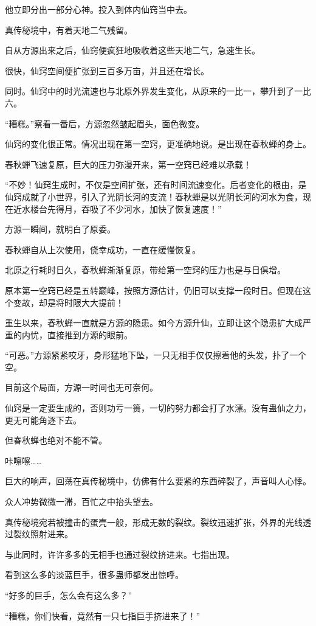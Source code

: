 \begin{this_body}
他立即分出一部分心神。投入到体内仙窍当中去。

真传秘境中，有着天地二气残留。

自从方源出来之后，仙窍便疯狂地吸收着这些天地二气，急速生长。

很快，仙窍空间便扩张到三百多万亩，并且还在增长。

同时。仙窍中的时光流速也与北原外界发生变化，从原来的一比一，攀升到了一比六。

“糟糕。”察看一番后，方源忽然皱起眉头，面色微变。

仙窍的变化很正常。情况出现在第一空窍，更准确地说。是出现在春秋蝉的身上。

春秋蝉飞速复原，巨大的压力弥漫开来，第一空窍已经难以承载！

“不妙！仙窍生成时，不仅是空间扩张，还有时间流速变化。后者变化的根由，是仙窍成就了小世界，引入了光阴长河的支流！春秋蝉是以光阴长河的河水为食，现在近水楼台先得月，吞吸了不少河水，加快了恢复速度！”

方源一瞬间，就明白了原委。

春秋蝉自从上次使用，侥幸成功，一直在缓慢恢复。

北原之行耗时日久，春秋蝉渐渐复原，带给第一空窍的压力也是与日俱增。

原本第一空窍已经是五转巅峰，按照方源估计，仍旧可以支撑一段时日。但现在这个变故，却是将时限大大提前！

重生以来，春秋蝉一直就是方源的隐患。如今方源升仙，立即让这个隐患扩大成严重的内忧，直接推到方源的眼前。

“可恶。”方源紧紧咬牙，身形猛地下坠，一只无相手仅仅擦着他的头发，扑了一个空。

目前这个局面，方源一时间也无可奈何。

仙窍是一定要生成的，否则功亏一篑，一切的努力都会打了水漂。没有蛊仙之力，更无可能角逐下去。

但春秋蝉也绝对不能不管。

咔嚓嚓……

巨大的响声，回荡在真传秘境中，仿佛有什么要紧的东西碎裂了，声音叫人心悸。

众人冲势微微一滞，百忙之中抬头望去。

真传秘境宛若被撞击的蛋壳一般，形成无数的裂纹。裂纹迅速扩张，外界的光线透过裂纹照射进来。

与此同时，许许多多的无相手也通过裂纹挤进来。七指出现。

看到这么多的淡蓝巨手，很多蛊师都发出惊呼。

“好多的巨手，怎么会有这么多？”

“糟糕，你们快看，竟然有一只七指巨手挤进来了！”


\end{this_body}
